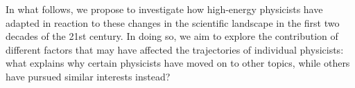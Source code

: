 \documentclass{article}
\begin{document}
In what follows, we propose to investigate how high-energy physicists have adapted in reaction to these changes in the scientific landscape in the first two decades of the 21st century. In doing so, we aim to explore the contribution of different factors that may have affected the trajectories of individual physicists: what explains why certain physicists have moved on to other topics, while others have pursued similar interests instead? 





\end{document}
